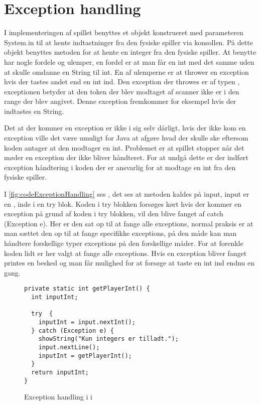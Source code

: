 \section{Exception handling} \label{sec:implementering:exception}
I implementeringen af spillet benyttes et  objekt konstrueret med parameteren System.in til at hente indtastninger fra den fysiske spiller via konsollen. På dette objekt benyttes metoden  for at hente en integer fra den fysiske spiller. At benytte  har nogle fordele og ulemper, en fordel er at man får en int med det samme uden at skulle omdanne en String til int. En af ulemperne er at  thrower en exception hvis der tastes andet end en int ind. Den exception der throwes er af typen , exceptionen betyder at den token der blev modtaget af scanner ikke er i den range der blev angivet\cite{javaExceptionInputMismatchException}. Denne exception fremkommer for eksempel hvis der indtastes en String.

Det at der kommer en exception er ikke i sig selv dårligt, hvis der ikke kom en exception ville det være umuligt for Java at afgøre hvad der skulle ske eftersom koden antager at den modtager en int. Problemet er at spillet stopper når det møder en exception der ikke bliver håndteret. For at undgå dette er der indført exception håndtering i koden der er ansvarlig for at modtage en int fra den fysiske spiller.

I \vref{fig:codeExceptionHandling} ses , det ses at metoden  kaldes på input, input er en , inde i en try blok. Koden i try blokken forsøges kørt hvis der kommer en exception på grund af koden i try blokken, vil den blive fanget af catch (Exception e). Her er den sat op til at fange alle exceptions, normal praksis er at man sættet den op til at fange specifikke exceptions, på den måde kan man håndtere forskellige typer exceptions på den forskellige måder. For at forenkle koden lidt er her valgt at fange alle exceptions. Hvis en exception bliver fanget printes en besked og man får mulighed for at forsøge at taste en int ind endnu en gang.

\begin{figure}
\caption{Exception handling i  i }
\label{fig:codeExceptionHandling}
\begin{lstlisting}
private static int getPlayerInt() {
  int inputInt;

  try  {
    inputInt = input.nextInt();
  } catch (Exception e) {
    showString("Kun integers er tilladt.");
    input.nextLine();
    inputInt = getPlayerInt();
  }
  return inputInt;
}
\end{lstlisting}
\end{figure}